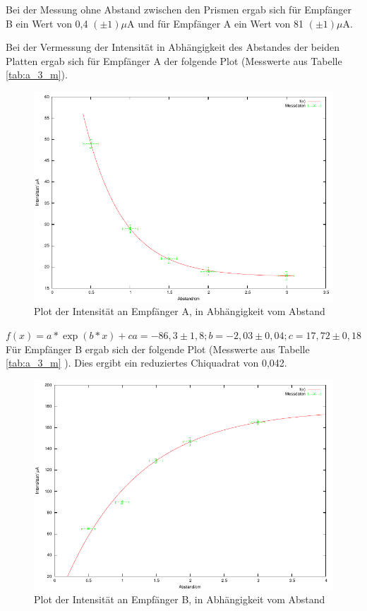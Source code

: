 \documentclass[12pt]{scrartcl}
\begin{document}
Bei der Messung ohne Abstand zwischen den Prismen ergab sich für Empfänger B ein Wert von 0,4 $(\pm 1) \mu$A und für Empfänger A ein Wert von 81 $(\pm 1) \mu$A.

Bei der Vermessung der Intensität in Abhängigkeit des Abstandes der beiden Platten ergab sich für Empfänger A der folgende Plot (Messwerte aus Tabelle \ref{tab:a_3_m}).

\begin{figure}[H]
\centering
    \includegraphics[scale = 1]{a_3_A.pdf}
  	\caption[Plot der Intensität an Empfänger A, in Abhängigkeit vom Abstand]{Plot der Intensität an Empfänger A, in Abhängigkeit vom Abstand}
  \label{fig:a_3_A}
\end{figure}
$f(x)= a*\exp(b*x) +c
a=-86,3 \pm 1,8; b=-2,03 \pm 0,04; c=17,72 \pm 0,18$
Für Empfänger B ergab sich der folgende Plot (Messwerte aus Tabelle \ref{tab:a_3_m} ).
Dies ergibt ein reduziertes Chiquadrat von 0,042.
\begin{figure}[H]
\centering
    \includegraphics[scale = 1]{a_3_B.pdf}
  	\caption[Plot der Intensität an Empfänger B, in Abhängigkeit vom Abstand]{Plot der Intensität an Empfänger B, in Abhängigkeit vom Abstand}
  \label{fig:a_3_B}
\end{figure}
\end{document}
